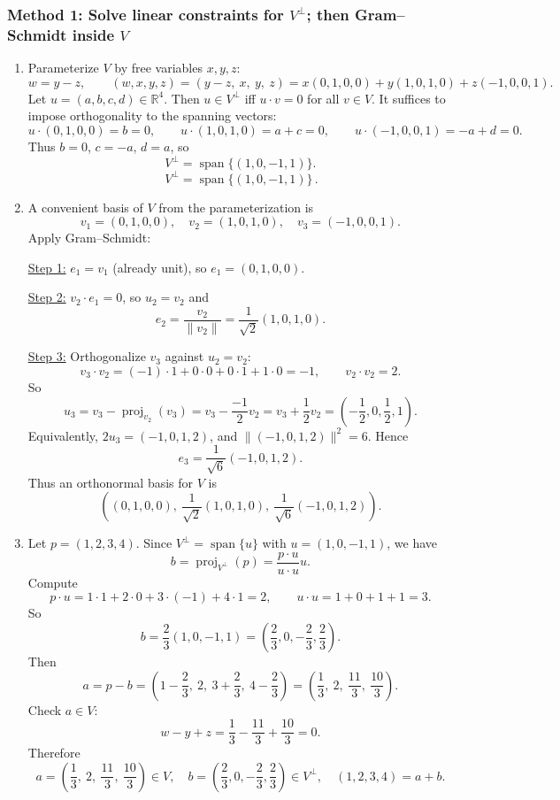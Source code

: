 \documentclass[12pt]{article}
\newcommand{\R}{\mathbb{R}}
\DeclareMathOperator{\Span}{span}
\DeclareMathOperator{\proj}{proj}
\begin{document}
\subsubsection{Method 1: Solve linear constraints for $V^\perp$; then Gram--Schmidt inside $V$}
\begin{enumerate}[label=(\alph*)]
\item Parameterize $V$ by free variables $x,y,z$:
\[
w=y-z,\qquad (w,x,y,z)=(y-z,\ x,\ y,\ z)=x(0,1,0,0)+y(1,0,1,0)+z(-1,0,0,1).
\]
Let $u=(a,b,c,d)\in\R^4$. Then $u\in V^\perp$ iff $u\cdot v=0$ for all $v\in V$.
It suffices to impose orthogonality to the spanning vectors:
\[
u\cdot(0,1,0,0)=b=0,\qquad
u\cdot(1,0,1,0)=a+c=0,\qquad
u\cdot(-1,0,0,1)=-a+d=0.
\]
Thus $b=0$, $c=-a$, $d=a$, so
\[
V^\perp=\Span\{(1,0,-1,1)\}.
\]
\[
\boxed{\,V^\perp=\Span\{(1,0,-1,1)\}\,}.
\]

\item A convenient basis of $V$ from the parameterization is
\[
v_1=(0,1,0,0),\quad v_2=(1,0,1,0),\quad v_3=(-1,0,0,1).
\]
Apply Gram--Schmidt:

\underline{Step 1:} $e_1=v_1$ (already unit), so $e_1=(0,1,0,0)$.

\underline{Step 2:} $v_2\cdot e_1=0$, so $u_2=v_2$ and
\[
e_2=\frac{v_2}{\|v_2\|}=\frac{1}{\sqrt2}(1,0,1,0).
\]

\underline{Step 3:} Orthogonalize $v_3$ against $u_2=v_2$:
\[
v_3\cdot v_2=(-1)\cdot 1+0\cdot 0+0\cdot 1+1\cdot 0=-1,\qquad v_2\cdot v_2=2.
\]
So
\[
u_3=v_3-\proj_{v_2}(v_3)=v_3-\frac{-1}{2}v_2=v_3+\frac12 v_2=\left(-\frac12,0,\frac12,1\right).
\]
Equivalently, $2u_3=(-1,0,1,2)$, and $\|(-1,0,1,2)\|^2=6$. Hence
\[
e_3=\frac{1}{\sqrt6}(-1,0,1,2).
\]
Thus an orthonormal basis for $V$ is
\[
\boxed{\,
\left(
(0,1,0,0),\ \frac{1}{\sqrt2}(1,0,1,0),\ \frac{1}{\sqrt6}(-1,0,1,2)
\right).
\,}
\]

\item Let $p=(1,2,3,4)$. Since $V^\perp=\Span\{u\}$ with $u=(1,0,-1,1)$, we have
\[
b=\proj_{V^\perp}(p)=\frac{p\cdot u}{u\cdot u}u.
\]
Compute
\[
p\cdot u=1\cdot 1+2\cdot 0+3\cdot(-1)+4\cdot 1=2,\qquad u\cdot u=1+0+1+1=3.
\]
So
\[
b=\frac{2}{3}(1,0,-1,1)=\left(\frac23,0,-\frac23,\frac23\right).
\]
Then
\[
a=p-b=\left(1-\frac23,\ 2,\ 3+\frac23,\ 4-\frac23\right)=\left(\frac13,\ 2,\ \frac{11}{3},\ \frac{10}{3}\right).
\]
Check $a\in V$:
\[
w-y+z=\frac13-\frac{11}{3}+\frac{10}{3}=0.
\]
Therefore
\[
\boxed{\,
a=\left(\frac13,\ 2,\ \frac{11}{3},\ \frac{10}{3}\right)\in V,
\quad
b=\left(\frac23,0,-\frac23,\frac23\right)\in V^\perp,
\quad
(1,2,3,4)=a+b.
\,}
\]
\end{enumerate}
\end{document}
